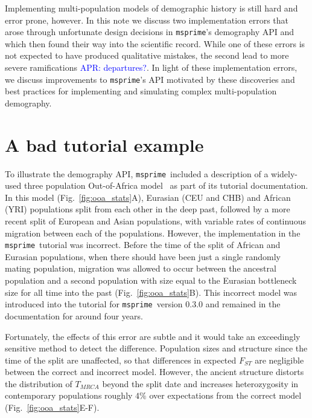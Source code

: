 \documentclass{article}
\newcommand{\msprime}[0]{\texttt{msprime}}
\newcommand{\aprcomment}[1]{{\textcolor{blue}{APR: #1}}}
\begin{document}
Implementing multi-population models of demographic history is still hard and error
prone, however. In this note we discuss two implementation errors that arose through
unfortunate design decisions in \msprime's demography API and which then found their way
into the scientific record. While one of these errors is not expected to have produced qualitative
mistakes, the second lead to more severe ramifications \aprcomment{departures?}. In light of these
implementation errors, we discuss improvements to \msprime's API motivated by these
discoveries and best practices for implementing and simulating complex multi-population
demography.

\section{A bad tutorial example}

To illustrate the demography API, \msprime\ included a description of a widely-used
three population Out-of-Africa model~\citep{gutenkunst2009inferring}
as part of its tutorial documentation. In this model (Fig.~\ref{fig:ooa_stats}A),
Eurasian (CEU and CHB) and African (YRI) populations split from each other in the deep past,
followed by a more recent split of European and Asian populations, with variable rates of
continuous migration between each of the populations. However, the implementation in the
\msprime\ tutorial was incorrect. Before the time of the split of African and Eurasian
populations, when there should have been just a single randomly mating population, migration was
allowed to occur between the ancestral population and a second population with size equal to
the Eurasian bottleneck size for all time into the past
(Fig.~\ref{fig:ooa_stats}B). This incorrect model was introduced into
the tutorial for \msprime\ version 0.3.0 and remained in the documentation for
around four years.

Fortunately, the effects of this error are subtle and it would take
an exceedingly sensitive method to detect the difference.
Population sizes and structure since the time of
the split are unaffected, so that differences in expected $F_{ST}$ are negligible between
the correct and incorrect model. However, the ancient structure distorts the distribution
of $T_{MRCA}$ beyond the split date and increases
heterozygosity in contemporary populations roughly $4\%$ over expectations
from the correct model (Fig.~\ref{fig:ooa_stats}E-F).
\end{document}
